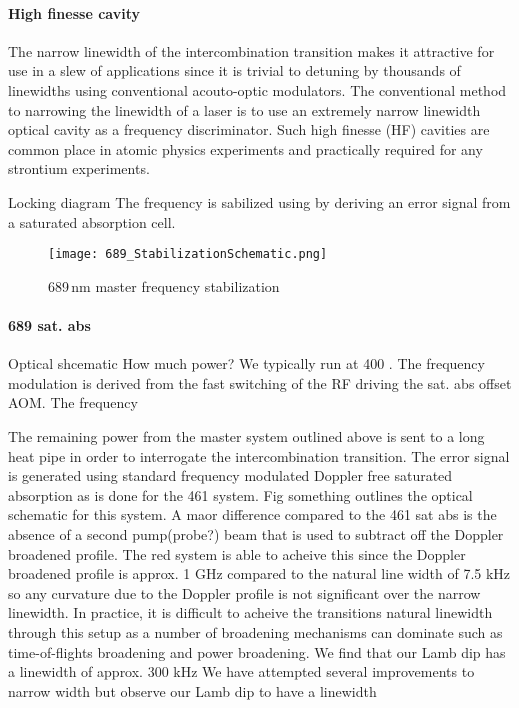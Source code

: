\paragraph{High finesse cavity}
The narrow linewidth of the intercombination transition makes it attractive for use in a slew of applications since it is trivial to detuning by thousands of linewidths using conventional acouto-optic modulators.
The conventional method to narrowing the linewidth of a laser is to use an extremely narrow linewidth optical cavity as a frequency discriminator.
Such high finesse (HF) cavities are common place in atomic physics experiments and practically required for any strontium experiments.

Locking diagram
The frequency is sabilized using by deriving an error signal from a saturated absorption cell.
	\begin{figure} 
		\centerline{
		\texttt{[image: 689\_StabilizationSchematic.png]}}
		\caption{689\,nm master frequency stabilization}
		\label{fig:689freqLock}
	\end{figure}
	
	

\paragraph{689 sat. abs}
Optical shcematic
How much power?
We typically run at 400 \degree.
The frequency modulation is derived from the fast switching of the RF driving the sat. abs offset AOM.
The frequency

The remaining power from the master system outlined above is sent to a long heat pipe in order to interrogate the intercombination transition.
The error signal is generated using standard frequency modulated Doppler free saturated absorption as is done for the 461 system.
Fig something outlines the optical schematic for this system.
A maor difference compared to the 461 sat abs is the absence of a second pump(probe?) beam that is used to subtract off the Doppler broadened profile.
The red system is able to acheive this since the Doppler broadened profile is approx. 1 GHz compared to the natural line width of 7.5 kHz so any curvature due to the Doppler profile is not significant over the narrow linewidth.
In practice, it is difficult to acheive the transitions natural linewidth through this setup as a number of broadening mechanisms can dominate such as time-of-flights broadening and power broadening.
We find that our Lamb dip has a linewidth of approx. 300 kHz
We have attempted several improvements to narrow width but observe our Lamb dip to have a linewidth 


